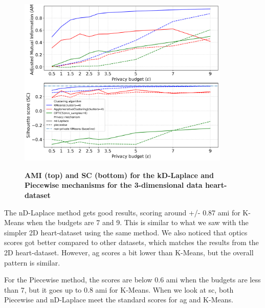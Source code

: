 \newpage
\begin{figure}[H]
  \centering

  \caption{\textbf{AMI (top) and SC (bottom) for the kD-Laplace and Piecewise mechanisms for the 3-dimensional data heart-dataset}}
  \includegraphics[width=0.9\textwidth]{Results/nd-laplace/nd-Laplace/heart-dataset/ami-and-sc_3_dimensions.png}
  \label{fig:validation-heart-dataset_comparison_3d-laplace}
\end{figure}
The nD-Laplace method gets good results, scoring around +/- 0.87 \gls{ami} for K-Means when the budgets are 7 and 9. This is similar to what we saw with the simpler 2D heart-dataset using the same method. We also noticed that \gls{optics} scores got better compared to other datasets, which matches the results from the 2D heart-dataset. However, \gls{ag} scores a bit lower than K-Means, but the overall pattern is similar.

For the Piecewise method, the scores are below 0.6 \gls{ami} when the budgets are less than 7, but it goes up to 0.8 \gls{ami} for K-Means. When we look at \gls{sc}, both Piecewise and nD-Laplace meet the standard scores for \gls{ag} and K-Means.

